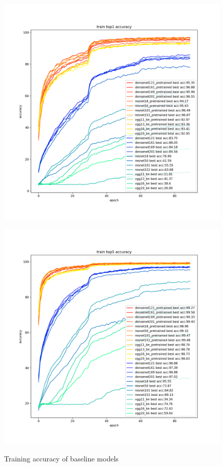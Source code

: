 \begin{figure}[ht]
  \begin{minipage}[t]{0.5\linewidth}
    \centering
    \includegraphics[width=1.1\textwidth]{figs/train_acc1.png}
    \label{fig:train_acc1}
  \end{minipage}\hfill
  \begin{minipage}[t]{0.5\linewidth}
    \centering
    \includegraphics[width=1.1\textwidth]{figs/train_acc5.png}
    \label{fig:train_acc5}
  \end{minipage}
  \caption{Training accuracy of baseline models}
\end{figure}

